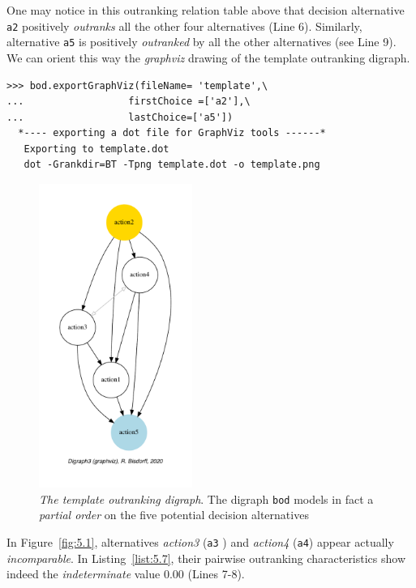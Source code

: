 One may notice in this outranking relation table above that decision alternative \texttt{a2} positively \emph{outranks} all the other four alternatives  (Line 6). Similarly, alternative \texttt{a5} is positively \emph{outranked} by all the other alternatives (see Line 9). We can orient this way the \emph{graphviz} drawing of the template outranking digraph. 
\begin{lstlisting}
>>> bod.exportGraphViz(fileName= 'template',\
...                  firstChoice =['a2'],\
...                  lastChoice=['a5'])
  *---- exporting a dot file for GraphViz tools ------*
   Exporting to template.dot
   dot -Grankdir=BT -Tpng template.dot -o template.png
\end{lstlisting}
\begin{figure}[ht]
\sidecaption[t]
\includegraphics[width=5cm]{Figures/5-1-template.pdf}
\caption[The template outranking digraph]{\emph{The template outranking digraph}. The digraph \texttt{bod} models in fact a \emph{partial order} on the five potential decision alternatives}
\label{fig:5.1}       %
\end{figure}

In Figure~\vref{fig:5.1}, alternatives \emph{action3} (\texttt{a3} ) and \emph{action4} (\texttt{a4}) appear actually \emph{incomparable}. In Listing~\vref{list:5.7}, their pairwise outranking characteristics show indeed the \emph{indeterminate} value $0.00$ (Lines 7-8).

